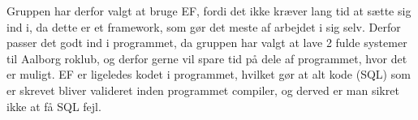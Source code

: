 Gruppen har derfor valgt at bruge EF, fordi det ikke kræver lang tid at sætte sig ind i, da dette er et framework, som gør det meste af arbejdet i sig selv. Derfor passer det godt ind i programmet, da gruppen har valgt at lave 2 fulde systemer til Aalborg roklub, og derfor gerne vil spare tid på dele af programmet, hvor det er muligt. EF er ligeledes kodet i programmet, hvilket gør at alt kode (SQL) som er skrevet bliver valideret inden programmet compiler, og derved er man sikret ikke at få SQL fejl.\\


